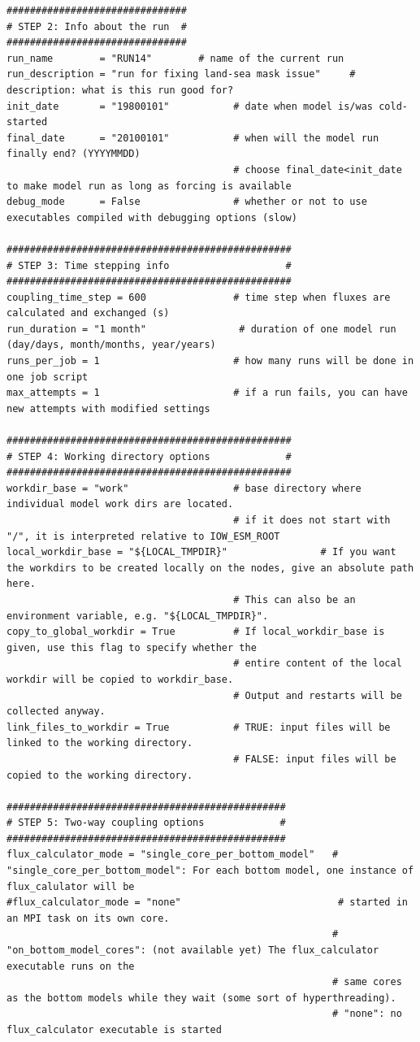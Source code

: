\documentclass[a4paper,titlepage]{scrartcl}
\begin{document}
\begin{verbatim}
###############################
# STEP 2: Info about the run  #
###############################
run_name        = "RUN14"        # name of the current run
run_description = "run for fixing land-sea mask issue"     # description: what is this run good for?
init_date       = "19800101"           # date when model is/was cold-started
final_date      = "20100101"           # when will the model run finally end? (YYYYMMDD) 
                                       # choose final_date<init_date to make model run as long as forcing is available
debug_mode      = False                # whether or not to use executables compiled with debugging options (slow)

#################################################
# STEP 3: Time stepping info                    #
#################################################
coupling_time_step = 600               # time step when fluxes are calculated and exchanged (s)
run_duration = "1 month"                # duration of one model run (day/days, month/months, year/years)
runs_per_job = 1                       # how many runs will be done in one job script
max_attempts = 1                       # if a run fails, you can have new attempts with modified settings

#################################################
# STEP 4: Working directory options             #
#################################################
workdir_base = "work"                  # base directory where individual model work dirs are located. 
                                       # if it does not start with "/", it is interpreted relative to IOW_ESM_ROOT
local_workdir_base = "${LOCAL_TMPDIR}"                # If you want the workdirs to be created locally on the nodes, give an absolute path here.
                                       # This can also be an environment variable, e.g. "${LOCAL_TMPDIR}".
copy_to_global_workdir = True          # If local_workdir_base is given, use this flag to specify whether the 
                                       # entire content of the local workdir will be copied to workdir_base.
                                       # Output and restarts will be collected anyway.
link_files_to_workdir = True           # TRUE: input files will be linked to the working directory.
                                       # FALSE: input files will be copied to the working directory.

################################################
# STEP 5: Two-way coupling options             #
################################################
flux_calculator_mode = "single_core_per_bottom_model"   # "single_core_per_bottom_model": For each bottom model, one instance of flux_calulator will be
#flux_calculator_mode = "none"                           # started in an MPI task on its own core.
                                                        # "on_bottom_model_cores": (not available yet) The flux_calculator executable runs on the 
                                                        # same cores as the bottom models while they wait (some sort of hyperthreading).
                                                        # "none": no flux_calculator executable is started


\end{verbatim}
\end{document}
